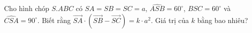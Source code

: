 \begin{ex}
Cho hình chóp $S.ABC$ có $SA=SB=SC=a$, $\widehat{ASB}=60^\circ$, $\widehat{BSC}=60^\circ$ và $\widehat{CSA}=90^\circ$. Biết rằng $\overrightarrow{SA}\cdot\left(\overrightarrow{SB}-\overrightarrow{SC}\right)=k\cdot a^2$. Giá trị của $k$ bằng bao nhiêu?
\end{ex}
